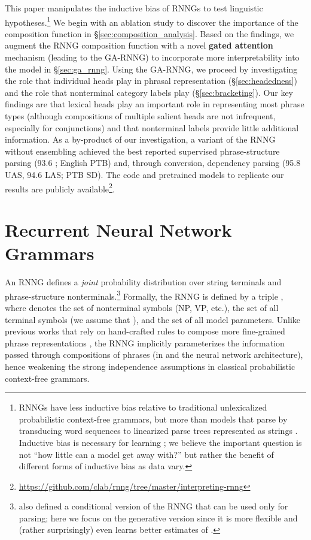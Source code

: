 \documentclass[11pt]{article}
\begin{document}
This paper manipulates the inductive bias of RNNGs to test linguistic hypotheses.\footnote{RNNGs have less inductive bias relative to traditional unlexicalized probabilistic context-free grammars, but more than models that parse by transducing word sequences to linearized parse trees represented as strings \cite{vinyals:2015}.  Inductive bias is necessary for learning \cite{mitchell-80}; we believe the important question is not ``how little can a model get away with?'' but rather the benefit of different forms of inductive bias as data vary.}
We begin with an ablation study to discover the importance of the composition function in \S\ref{sec:composition_analysis}. Based on the findings, we augment the RNNG composition function with a novel \textbf{gated attention} mechanism (leading to the GA-RNNG) to incorporate more interpretability into the model in \S\ref{sec:ga_rnng}. Using the GA-RNNG, we proceed by investigating the role that individual heads play in phrasal representation (\S\ref{sec:headedness}) and the role that nonterminal category labels play (\S\ref{sec:bracketing}). Our key findings are that lexical heads play an important role in representing most phrase types (although compositions of multiple salient heads are not infrequent, especially for conjunctions) and that nonterminal labels provide little additional information. As a by-product of our investigation, a variant of the RNNG without ensembling achieved the best reported supervised phrase-structure parsing (93.6 ; English PTB) and, through conversion, dependency parsing (95.8 UAS, 94.6 LAS; PTB SD). The code and pretrained models to replicate our results are publicly available\footnote{\url{https://github.com/clab/rnng/tree/master/interpreting-rnng}}.


\section{Recurrent Neural Network Grammars}\label{sec:rnng}

An RNNG defines a \emph{joint} probability distribution over string terminals and phrase-structure nonterminals.\footnote{ also defined a conditional version of the RNNG that can be used only for parsing; here we focus on the generative version since it is more flexible and (rather surprisingly) even learns better estimates of .} Formally, the RNNG is defined by a triple , where  denotes the set of nonterminal symbols (NP, VP, etc.),  the set of all terminal symbols (we assume that ), and  the set of all model parameters. Unlike previous works that rely on hand-crafted rules to compose more fine-grained phrase representations \cite{collins_97,klein_03}, the RNNG implicitly parameterizes the information passed through compositions of phrases (in  and the neural network architecture), hence weakening the strong independence assumptions in classical probabilistic context-free grammars. 
\end{document}
